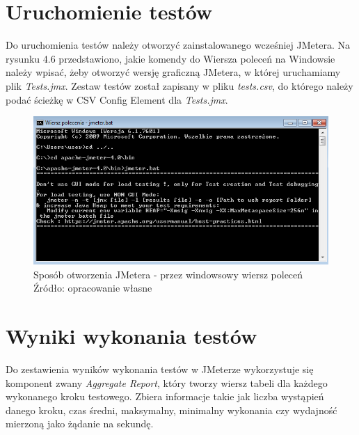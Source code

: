 \section{Uruchomienie testów}

Do uruchomienia testów należy otworzyć zainstalowanego wcześniej JMetera. Na rysunku 4.6 przedstawiono, jakie komendy do Wiersza poleceń na Windowsie należy wpisać, żeby otworzyć wersję graficzną JMetera, w której uruchamiamy plik \textit{Tests.jmx}. Zestaw testów został zapisany w pliku \textit{tests.csv}, do którego należy podać ścieżkę w CSV Config Element dla \textit{Tests.jmx}.

\begin{figure}[H]
\centering
\captionsetup{justification=centering}
\includegraphics[width=1\textwidth]{testy_csv.png}
\caption[Sposób otworzenia JMetera - przez windowsowy wiersz poleceń]{\label{fig:ham}Sposób otworzenia JMetera - przez windowsowy wiersz poleceń \\ Źródło: opracowanie własne}
\end{figure}

\section{Wyniki wykonania testów}

Do zestawienia wyników wykonania testów w JMeterze wykorzystuje się komponent zwany \textit{Aggregate Report}, który tworzy wiersz tabeli dla każdego wykonanego kroku testowego. Zbiera informacje takie jak liczba wystąpień danego kroku, czas średni, maksymalny, minimalny wykonania czy wydajność mierzoną jako żądanie na sekundę. \cite{comp}

